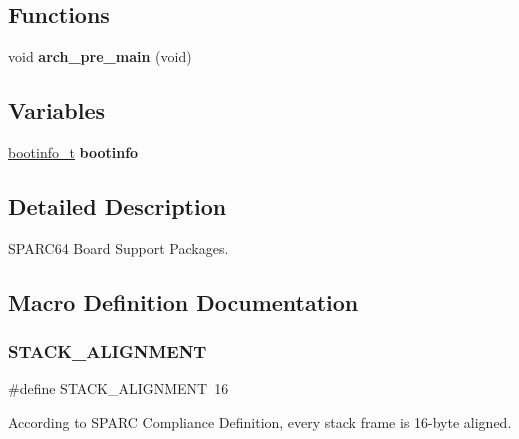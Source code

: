 \subsection*{Functions}
\begin{DoxyCompactItemize}
\item 
\mbox{\label{group__RTEMSBSPsSPARC64_ga6653ba57bbebc0037732add25b1b327e}} 
void {\bfseries arch\+\_\+pre\+\_\+main} (void)
\end{DoxyCompactItemize}
\subsection*{Variables}
\begin{DoxyCompactItemize}
\item 
\mbox{\label{group__RTEMSBSPsSPARC64_ga43e5cee1e288aa01093799c7d1b74bfa}} 
\mbox{\hyperlink{structbootinfo__t}{bootinfo\+\_\+t}} {\bfseries bootinfo}
\end{DoxyCompactItemize}


\subsection{Detailed Description}
S\+P\+A\+R\+C64 Board Support Packages. 



\subsection{Macro Definition Documentation}
\mbox{\label{group__RTEMSBSPsSPARC64_ga112ac222442ad424caa8087c47fa8430}} 
\subsubsection{\texorpdfstring{STACK\_ALIGNMENT}{STACK\_ALIGNMENT}}
{\footnotesize\ttfamily \#define S\+T\+A\+C\+K\+\_\+\+A\+L\+I\+G\+N\+M\+E\+NT~16}

According to S\+P\+A\+RC Compliance Definition, every stack frame is 16-\/byte aligned. \mbox{\label{group__RTEMSBSPsSPARC64_gab476f3144642c382bf6c51a5b8fb19cc}} 
